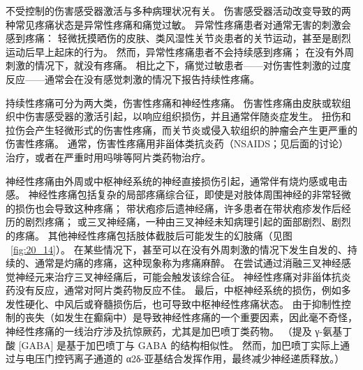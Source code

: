 不受控制的伤害感受器激活与多种病理状况有关。
伤害感受器活动改变导致的两种常见疼痛状态是异常性疼痛和痛觉过敏。
异常性疼痛患者对通常无害的刺激会感到疼痛：
轻微抚摸晒伤的皮肤、类风湿性关节炎患者的关节运动，甚至是剧烈运动后早上起床的行为。
然而，异常性疼痛患者不会持续感到疼痛；
在没有外周刺激的情况下，就没有疼痛。
相比之下，痛觉过敏患者——对伤害性刺激的过度反应——通常会在没有感觉刺激的情况下报告持续性疼痛。


持续性疼痛可分为两大类，伤害性疼痛和神经性疼痛。
伤害性疼痛由皮肤或软组织中伤害感受器的激活引起，以响应组织损伤，并且通常伴随炎症发生。
扭伤和拉伤会产生轻微形式的伤害性疼痛，而关节炎或侵入软组织的肿瘤会产生更严重的伤害性疼痛。
通常，伤害性疼痛用非甾体类抗炎药（NSAIDS；见后面的讨论）治疗，或者在严重时用吗啡等阿片类药物治疗。


神经性疼痛由外周或中枢神经系统的神经直接损伤引起，通常伴有烧灼感或电击感。
神经性疼痛包括复杂的局部疼痛综合征，即使是对肢体周围神经的非常轻微的损伤也会导致这种疼痛；
带状疱疹后遗神经痛，许多患者在带状疱疹发作后经历的剧烈疼痛；
或三叉神经痛，一种由三叉神经未知病理引起的面部剧烈、剧烈的疼痛。
其他神经性疼痛包括肢体截肢后可能发生的幻肢痛（见图 ~\ref{fig:20_14}）。
在某些情况下，甚至可以在没有外周刺激的情况下发生自发的、持续的、通常是灼痛的疼痛，这种现象称为疼痛麻醉。
在尝试通过消融三叉神经感觉神经元来治疗三叉神经痛后，可能会触发该综合征。
神经性疼痛对非甾体抗炎药没有反应，通常对阿片类药物反应不佳。
最后，中枢神经系统的损伤，例如多发性硬化、中风后或脊髓损伤后，也可导致中枢神经性疼痛状态。
由于抑制性控制的丧失（如发生在癫痫中）是导致神经性疼痛的一个重要因素，因此毫不奇怪，神经性疼痛的一线治疗涉及抗惊厥药，尤其是加巴喷丁类药物。
（提及 γ-氨基丁酸 [GABA] 是基于加巴喷丁与 GABA 的结构相似性。
然而，加巴喷丁实际上通过与电压门控钙离子通道的 α2δ-亚基结合发挥作用，最终减少神经递质释放。）


